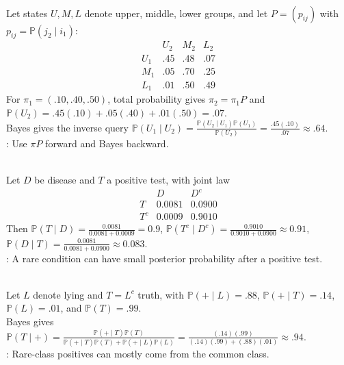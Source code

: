 \begin{example} \label{ex:transition-probability-table-total-probability} \label{ex:inverse-transition-query-bayes} \\
Let states $U,M,L$ denote upper, middle, lower groups, and let $P=(p_{ij})$ with $p_{ij}=\mathbb{P}(j_2\mid i_1)$:
\[
\begin{array}{c|ccc}
&U_2&M_2&L_2\\ \hline
U_1&.45&.48&.07\\
M_1&.05&.70&.25\\
L_1&.01&.50&.49
\end{array}
\]
For $\pi_1=(.10,.40,.50)$, total probability gives $\pi_2=\pi_1P$ and $\mathbb{P}(U_2)=.45(.10)+.05(.40)+.01(.50)=.07$.\\
Bayes gives the inverse query $\mathbb{P}(U_1\mid U_2)=\frac{\mathbb{P}(U_2\mid U_1)\mathbb{P}(U_1)}{\mathbb{P}(U_2)}=\frac{.45(.10)}{.07}\approx.64$.\\
: Use $\pi P$ forward and Bayes backward.
\end{example}

\begin{example} \label{ex:medical-test-base-rate} \\
Let $D$ be disease and $T$ a positive test, with joint law
\begin{equation*}
\begin{array}{c|cc}
&D&D^c\\ \hline
T&0.0081&0.0900\\
T^c&0.0009&0.9010
\end{array}
\end{equation*}
Then $\mathbb{P}(T\mid D)=\frac{0.0081}{0.0081+0.0009}=0.9$, $\mathbb{P}(T^c\mid D^c)=\frac{0.9010}{0.9010+0.0900}\approx0.91$, $\mathbb{P}(D\mid T)=\frac{0.0081}{0.0081+0.0900}\approx0.083$.\\
: A rare condition can have small posterior probability after a positive test.
\end{example}

\begin{example} \label{ex:rare-class-screening-base-rate} \\
Let $L$ denote lying and $T=L^c$ truth, with $\mathbb{P}(+\mid L)=.88$, $\mathbb{P}(+\mid T)=.14$, $\mathbb{P}(L)=.01$, and $\mathbb{P}(T)=.99$.\\
Bayes gives $\mathbb{P}(T\mid +)=\frac{\mathbb{P}(+\mid T)\mathbb{P}(T)}{\mathbb{P}(+\mid T)\mathbb{P}(T)+\mathbb{P}(+\mid L)\mathbb{P}(L)}=\frac{(.14)(.99)}{(.14)(.99)+(.88)(.01)}\approx.94$.\\
: Rare-class positives can mostly come from the common class.
\end{example}

